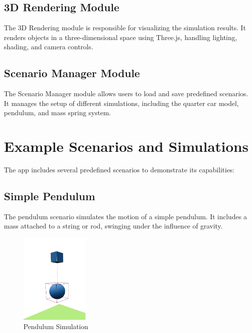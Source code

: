 \subsection{3D Rendering Module}

The 3D Rendering module is responsible for visualizing the simulation results. It renders objects in a three-dimensional space using Three.js, handling lighting, shading, and camera controls.

\subsection{Scenario Manager Module}

The Scenario Manager module allows users to load and save predefined scenarios. It manages the setup of different simulations, including the quarter car model, pendulum, and mass spring system.

\section{Example Scenarios and Simulations}

The app includes several predefined scenarios to demonstrate its capabilities:

\subsection{Simple Pendulum}
The pendulum scenario simulates the motion of a simple pendulum. It includes a mass attached to a string or rod, swinging under the influence of gravity.

\begin{figure}[h!]
    \centering
    \includegraphics[width=0.3\textwidth]{pendulum.png}
    \caption{Pendulum Simulation}
    \label{fig:pendulum}
\end{figure}



